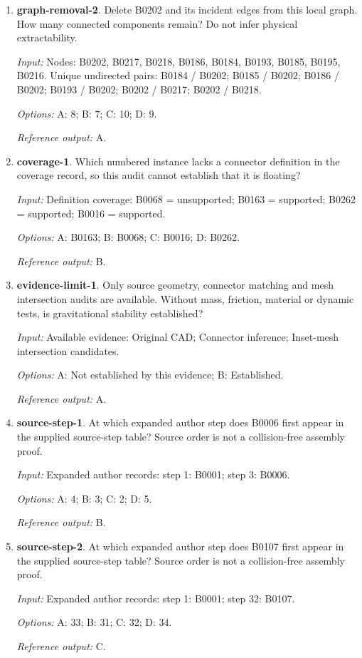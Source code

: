 \begin{enumerate}
\item \textbf{graph-removal-2}. Delete B0202 and its incident edges from this local graph. How many connected components remain? Do not infer physical extractability.\par {\small \textit{Input:} Nodes: B0202, B0217, B0218, B0186, B0184, B0193, B0185, B0195, B0216. Unique undirected pairs: B0184 / B0202; B0185 / B0202; B0186 / B0202; B0193 / B0202; B0202 / B0217; B0202 / B0218. \par\textit{Options:} A: 8; B: 7; C: 10; D: 9. \par\textit{Reference output:} A.}
\item \textbf{coverage-1}. Which numbered instance lacks a connector definition in the coverage record, so this audit cannot establish that it is floating?\par {\small \textit{Input:} Definition coverage: B0068 = unsupported; B0163 = supported; B0262 = supported; B0016 = supported. \par\textit{Options:} A: B0163; B: B0068; C: B0016; D: B0262. \par\textit{Reference output:} B.}
\item \textbf{evidence-limit-1}. Only source geometry, connector matching and mesh intersection audits are available. Without mass, friction, material or dynamic tests, is gravitational stability established?\par {\small \textit{Input:} Available evidence: Original CAD; Connector inference; Inset-mesh intersection candidates. \par\textit{Options:} A: Not established by this evidence; B: Established. \par\textit{Reference output:} A.}
\item \textbf{source-step-1}. At which expanded author step does B0006 first appear in the supplied source-step table? Source order is not a collision-free assembly proof.\par {\small \textit{Input:} Expanded author records: step 1: B0001; step 3: B0006. \par\textit{Options:} A: 4; B: 3; C: 2; D: 5. \par\textit{Reference output:} B.}
\item \textbf{source-step-2}. At which expanded author step does B0107 first appear in the supplied source-step table? Source order is not a collision-free assembly proof.\par {\small \textit{Input:} Expanded author records: step 1: B0001; step 32: B0107. \par\textit{Options:} A: 33; B: 31; C: 32; D: 34. \par\textit{Reference output:} C.}

\end{enumerate}
